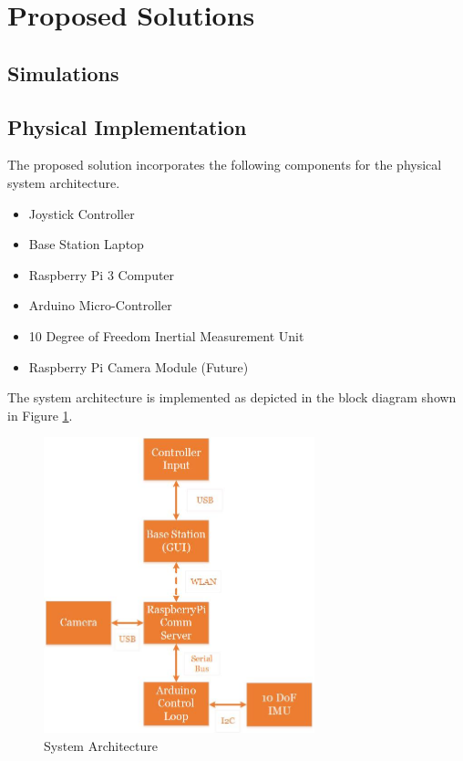 
\section{Proposed Solutions}

\subsection{Simulations}

\subsection{Physical Implementation}

The proposed solution incorporates the following components for the physical system architecture.

\begin{itemize}
\item Joystick Controller
\item Base Station Laptop
\item Raspberry Pi 3 Computer
\item Arduino Micro-Controller
\item 10 Degree of Freedom Inertial Measurement Unit
\item Raspberry Pi Camera Module (Future)
\end{itemize}

The system architecture is implemented as depicted in the block diagram shown in Figure \ref{fig:sys_arch}. 

\begin{figure}[H]
	\centering
	\includegraphics[width=0.7\textwidth]{flowchart-architecture.jpg}
	\caption{System Architecture}
	\label{fig:sys_arch}	
\end{figure}


